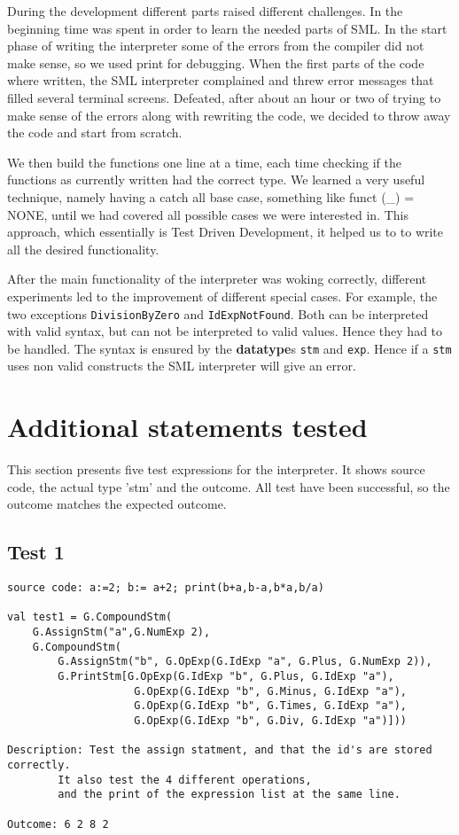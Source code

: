 \documentclass[a4paper]{article}
\begin{document}
During the development different parts raised different challenges. In the beginning time was spent in order to learn the needed parts of SML. In the start phase of writing the interpreter some of the errors from the compiler did not make sense, so we used print for debugging. When the first parts of the code where written, the SML interpreter complained and threw error messages that filled several terminal screens. Defeated, after about an hour or two of trying to make sense of the errors along with rewriting the code, we decided to throw away the code and start from scratch.

We then build the functions one line at a time, each time checking if the functions as currently written had the correct type. We learned a very useful technique, namely having a catch all base case, something like funct (\_) = NONE, until we had covered all possible cases we were interested in. This approach, which essentially is Test Driven Development, it helped us to to write all the desired functionality.

After the main functionality of the interpreter was woking correctly, different experiments led to the improvement of different special cases. For example, the two exceptions \texttt{DivisionByZero} and \texttt{IdExpNotFound}. Both can be interpreted with valid syntax, but can not be interpreted to valid values. Hence they had to be handled. The syntax is ensured by the \textbf{datatype}s \texttt{stm} and \texttt{exp}. Hence if a \texttt{stm} uses non valid constructs the SML interpreter will give an error.



\section{Additional statements tested}

This section presents five test expressions for the interpreter. It shows source code, the actual type 'stm' and the outcome. All test have been successful, so the outcome matches the expected outcome. 



\subsection{Test 1}
\begin{lstlisting}
source code: a:=2; b:= a+2; print(b+a,b-a,b*a,b/a)

val test1 = G.CompoundStm(
	G.AssignStm("a",G.NumExp 2),
	G.CompoundStm(
	    G.AssignStm("b", G.OpExp(G.IdExp "a", G.Plus, G.NumExp 2)),
	    G.PrintStm[G.OpExp(G.IdExp "b", G.Plus, G.IdExp "a"),
	    			G.OpExp(G.IdExp "b", G.Minus, G.IdExp "a"),
	    			G.OpExp(G.IdExp "b", G.Times, G.IdExp "a"),
	    			G.OpExp(G.IdExp "b", G.Div, G.IdExp "a")]))

Description: Test the assign statment, and that the id's are stored correctly.
		It also test the 4 different operations, 
		and the print of the expression list at the same line.

Outcome: 6 2 8 2
\end{lstlisting}
\end{document}
